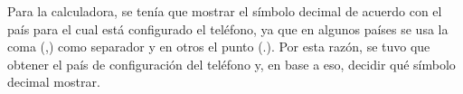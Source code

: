 \begin{itemize}
Para la calculadora, se tenía que mostrar el símbolo decimal de acuerdo con el país para el cual está configurado el teléfono, ya que en algunos países se usa la coma (,) como separador y en otros el punto (.). Por esta razón, se tuvo que obtener el país de configuración del teléfono y, en base a eso, decidir qué símbolo decimal mostrar.

\end{itemize}
%
%
%
%
%
%
